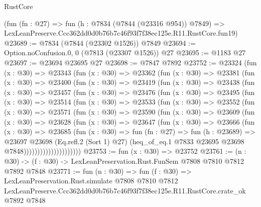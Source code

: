 \begin{lexlean}{RustCore}
\begin{coremodule}
    (fun (fn : @27) =>
    fun (h : @7834 (@7844 (@23316 @954)) @7849) =>
    LexLeanPreserve.Ccc362dd0d0b76b7c46f93f7f38ec125e.R11.RustCore.fun19)
@23689 := @7834 (@7844 (@23302 @1526)) @7849
@23694 := Option.noConfusion.{0, 0} (@7813 (@23307 @1526)) @27
@23695 := @1183 @27
@23697 := @23694 @23695 @27
@23698 := @7847 @7892
@23752 := @23324
    (fun (x : @30) =>
    @23343
      (fun (x : @30) =>
      @23362
        (fun (x : @30) =>
        @23381
          (fun (x : @30) =>
          @23400
            (fun (x : @30) =>
            @23419
              (fun (x : @30) =>
              @23438
                (fun (x : @30) =>
                @23457
                  (fun (x : @30) =>
                  @23476
                    (fun (x : @30) =>
                    @23495
                      (fun (x : @30) =>
                      @23514
                        (fun (x : @30) =>
                        @23533
                          (fun (x : @30) =>
                          @23552
                            (fun (x : @30) =>
                            @23571
                              (fun (x : @30) =>
                              @23590
                                (fun (x : @30) =>
                                @23609
                                  (fun (x : @30) =>
                                  @23628
                                    (fun (x : @30) =>
                                    @23647
                                      (fun (x : @30) =>
                                      @23666
                                        (fun (x : @30) =>
                                        @23685
                                          (fun (x : @30) =>
                                          fun (fn : @27) =>
                                          fun (h : @23689) =>
                                          @23697
                                            @23698
                                            (Eq.refl.{2} (Sort 1) @27)
                                            (heq_of_eq.{1}
                                              @7833
                                              @23695
                                              @23698
                                              @7848)))))))))))))))))))))
@23753 := fun (x : @30) => @23752
@23761 := (n : @30) -> (f : @30) -> LexLeanPreservation.Rust.FunSem @7808 @7810 @7812 @7892 @7848
@23771 := fun (n : @30) =>
  fun (f : @30) =>
  LexLeanPreservation.Rust.simulate
    @7808
    @7810
    @7812
    LexLeanPreserve.Ccc362dd0d0b76b7c46f93f7f38ec125e.R11.RustCore.crate_ok
    @7892
    @7848
\end{coremodule}
\end{lexlean}
